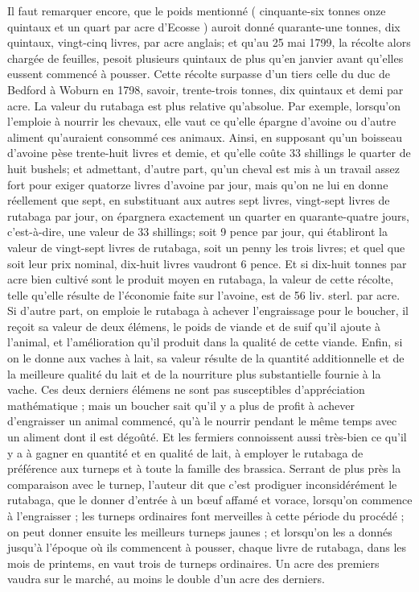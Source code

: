 Il faut remarquer encore, que le poids mentionné ( cinquante-six tonnes onze quintaux et un quart par acre d'Ecosse ) auroit donné quarante-une tonnes, dix quintaux, vingt-cinq livres, par acre anglais; et qu'au 25 mai 1799, la récolte alors chargée de feuilles, pesoit plusieurs quintaux de plus qu'en janvier avant qu'elles eussent commencé à pousser. Cette récolte surpasse d'un tiers celle du duc de Bedford à Woburn en 1798, savoir, trente-trois tonnes, dix quintaux et demi par acre.
La valeur du rutabaga est plus relative qu'absolue. Par exemple, lorsqu'on l'emploie à nourrir les chevaux, elle vaut ce qu'elle\setcounter{page}{383} épargne d’avoine ou d’autre aliment qu’auraient consommé ces animaux. Ainsi, en supposant qu’un boisseau d’avoine pèse trente-huit livres et demie, et qu’elle coûte 33 shillings le quarter de huit bushels; et admettant, d’autre part, qu’un cheval est mis à un travail assez fort pour exiger quatorze livres d’avoine par jour, mais qu’on ne lui en donne réellement que sept, en substituant aux autres sept livres, vingt-sept livres de rutabaga par jour, on épargnera exactement un quarter en quarante-quatre jours, c’est-à-dire, une valeur de 33 shillings; soit 9 pence par jour, qui établiront la valeur de vingt-sept livres de rutabaga, soit un penny les trois livres; et quel que soit leur prix nominal, dix-huit livres vaudront 6 pence. Et si dix-huit tonnes par acre bien cultivé sont le produit moyen en rutabaga, la valeur de cette récolte, telle qu’elle résulte de l’économie faite sur l’avoine, est de 56 liv. sterl. par acre. Si d’autre part, on emploie le rutabaga à achever l’engraissage pour le boucher, il reçoit sa valeur de deux élémens, le poids de viande et de suif qu’il ajoute à l’animal, et l’amélioration qu’il produit dans la qualité de cette viande. Enfin, si on le donne aux vaches à lait, sa valeur résulte de la quantité additionnelle et de la meilleure\setcounter{page}{384} qualité du lait et de la nourriture plus substantielle fournie à la vache. Ces deux derniers élémens ne sont pas susceptibles d'appréciation mathématique ; mais un boucher sait qu'il y a plus de profit à achever d'engraisser un animal commencé, qu'à le nourrir pendant le même temps avec un aliment dont il est dégoûté. Et les fermiers connoissent aussi très-bien ce qu'il y a à gagner en quantité et en qualité de lait, à employer le rutabaga de préférence aux turneps et à toute la famille des brassica.
Serrant de plus près la comparaison avec le turnep, l'auteur dit que c'est prodiguer inconsidérément le rutabaga, que le donner d'entrée à un bœuf affamé et vorace, lorsqu'on commence à l'engraisser ; les turneps ordinaires font merveilles à cette période du procédé ; on peut donner ensuite les meilleurs turneps jaunes ; et lorsqu'on les a donnés jusqu'à l'époque où ils commencent à pousser, chaque livre de rutabaga, dans les mois de printems, en vaut trois de turneps ordinaires. Un acre des premiers vaudra sur le marché, au moins le double d'un acre des derniers.
